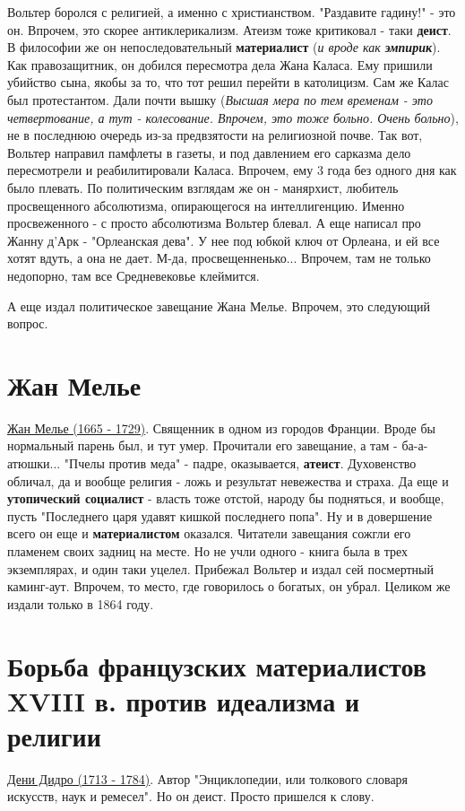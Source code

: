 Вольтер боролся с религией, а именно с христианством. "Раздавите гадину!" - это он. Впрочем, это скорее антиклерикализм. Атеизм тоже критиковал - таки \textbf{деист}. В философии же он непоследовательный \textbf{материалист} (\textit{и вроде как \textbf{эмпирик}}). Как правозащитник, он добился пересмотра дела Жана Каласа. Ему пришили убийство сына, якобы за то, что тот решил перейти в католицизм. Сам же Калас был протестантом. Дали почти вышку (\textit{Высшая мера по тем временам - это четвертование, а тут - колесование. Впрочем, это тоже больно. Очень больно}), не в последнюю очередь из-за предвзятости на религиозной почве. Так вот, Вольтер направил памфлеты в газеты, и под давлением его сарказма дело пересмотрели и реабилитировали Каласа. Впрочем, ему 3 года без одного дня как было плевать. По политическим взглядам же он - манярхист, любитель просвещенного абсолютизма, опирающегося на интеллигенцию. Именно просвеженного - с просто абсолютизма Вольтер блевал. А еще написал про Жанну д'Арк - "Орлеанская дева". У нее под юбкой ключ от Орлеана, и ей все хотят вдуть, а она не дает. М-да, просвещенненько... Впрочем, там не только недопорно, там все Средневековье клеймится.  

А еще издал политическое завещание Жана Мелье. Впрочем, это следующий вопрос.


\section{Жан Мелье}
\underline{Жан Мелье (1665 - 1729)}. Священник в одном из городов Франции. Вроде бы нормальный парень был, и тут умер.  Прочитали его завещание, а там - ба-а-атюшки... "Пчелы против меда" - падре, оказывается, \textbf{атеист}. Духовенство обличал, да и вообще религия - ложь и результат невежества и страха. Да еще и \textbf{утопический социалист} - власть тоже отстой, народу бы подняться, и вообще, пусть "Последнего царя удавят кишкой последнего попа". Ну и в довершение всего он еще и \textbf{материалистом} оказался. Читатели завещания сожгли его пламенем своих задниц на месте. Но не учли одного - книга была в трех экземплярах, и один таки уцелел. Прибежал Вольтер и издал сей посмертный каминг-аут. Впрочем, то место, где говорилось о богатых, он убрал. Целиком же издали только в 1864 году.

\section{Борьба французских материалистов XVIII в. против идеализма и религии}
\underline{Дени Дидро (1713 - 1784)}. Автор "Энциклопедии, или толкового словаря искусств, наук и ремесел". Но он деист. Просто пришелся к слову.

